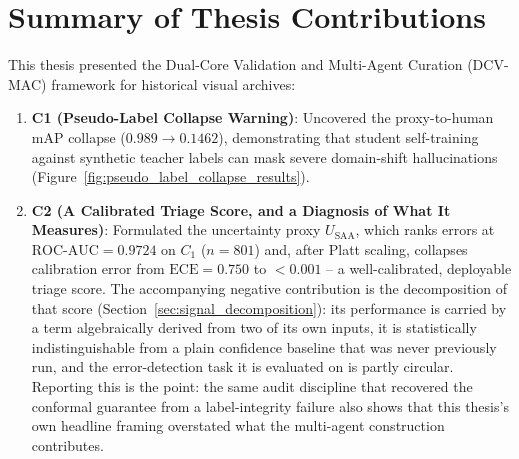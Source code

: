 \documentclass[12pt,a4paper]{report}
\begin{document}
\section{Summary of Thesis Contributions}
This thesis presented the Dual-Core Validation and Multi-Agent Curation (DCV-MAC) framework for historical visual archives:
\begin{enumerate}
    \item \textbf{C1 (Pseudo-Label Collapse Warning)}: Uncovered the proxy-to-human mAP collapse ($0.989 \rightarrow 0.1462$), demonstrating that student self-training against synthetic teacher labels can mask severe domain-shift hallucinations (Figure~\ref{fig:pseudo_label_collapse_results}).
    \item \textbf{C2 (A Calibrated Triage Score, and a Diagnosis of What It Measures)}: Formulated the uncertainty proxy $U_{\text{SAA}}$, which ranks errors at $\text{ROC-AUC}=0.9724$ on $C_1$ ($n=801$) and, after Platt scaling, collapses calibration error from $\text{ECE}=0.750$ to $<0.001$ -- a well-calibrated, deployable triage score. The accompanying negative contribution is the decomposition of that score (Section~\ref{sec:signal_decomposition}): its performance is carried by a term algebraically derived from two of its own inputs, it is statistically indistinguishable from a plain confidence baseline that was never previously run, and the error-detection task it is evaluated on is partly circular. Reporting this is the point: the same audit discipline that recovered the conformal guarantee from a label-integrity failure also shows that this thesis's own headline framing overstated what the multi-agent construction contributes.

\end{enumerate}
\end{document}
